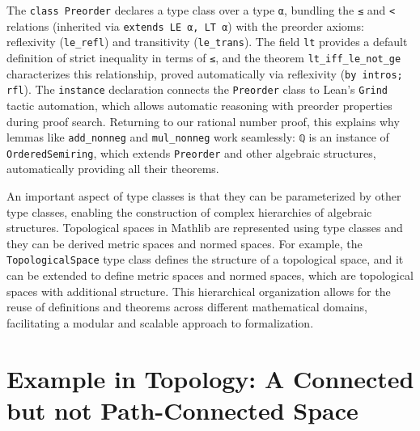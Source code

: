 The \lstinline[language=lean]|class Preorder| declares a type class over a type
\lstinline[language=lean]|α|, bundling the \lstinline[language=lean]|≤|
and \lstinline[language=lean]|<| relations
(inherited via \lstinline[language=lean]|extends LE α, LT α|)
with the preorder axioms: reflexivity (\lstinline[language=lean]|le_refl|)
and transitivity (\lstinline[language=lean]|le_trans|).
The field \lstinline[language=lean]|lt| provides a default definition of strict
inequality in terms of \lstinline[language=lean]|≤|,
and the theorem \lstinline[language=lean]|lt_iff_le_not_ge| characterizes this relationship,
proved automatically via reflexivity (\lstinline[language=lean]|by intros; rfl|).
The \lstinline[language=lean]|instance| declaration connects the \lstinline[language=lean]|Preorder|
class to Lean's \lstinline[language=lean]|Grind| tactic automation, which allows automatic
reasoning with preorder properties during proof search.
Returning to our rational number proof, this explains why lemmas
like \lstinline[language=lean]|add_nonneg| and \lstinline[language=lean]|mul_nonneg|
work seamlessly: \lstinline[language=lean]|ℚ| is an instance of
\lstinline[language=lean]|OrderedSemiring|, which extends
\lstinline[language=lean]|Preorder| and other algebraic structures,
automatically providing all their theorems.


An important aspect of type classes is that they can be parameterized by other type classes,
enabling the construction of complex hierarchies of algebraic structures.
Topological spaces in Mathlib are represented using type classes and they can be derived metric spaces and normed spaces.
For example, the \lstinline[language=lean]|TopologicalSpace| type class defines
the structure of a topological space, and it can be extended to define metric spaces
and normed spaces, which are topological spaces with additional structure.
This hierarchical organization allows for the reuse of definitions and theorems across different
mathematical domains, facilitating a modular and scalable approach to formalization.
\section{Example in Topology: A Connected but not Path-Connected Space}

